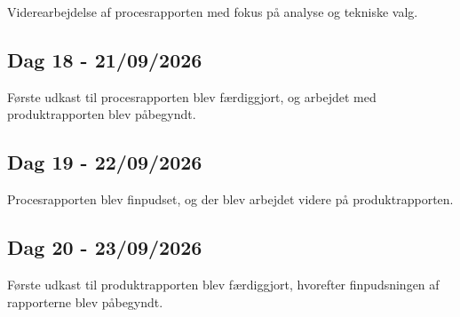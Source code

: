 \documentclass[a4paper, 11pt]{article}
\begin{document}
Viderearbejdelse af procesrapporten med fokus på analyse og tekniske valg.

\subsection{Dag 18 - 21/09/2026}

Første udkast til procesrapporten blev færdiggjort, og arbejdet med produktrapporten blev
påbegyndt.

\subsection{Dag 19 - 22/09/2026}

Procesrapporten blev finpudset, og der blev arbejdet videre på produktrapporten.

\subsection{Dag 20 - 23/09/2026}

Første udkast til produktrapporten blev færdiggjort, hvorefter finpudsningen af rapporterne
blev påbegyndt.
\end{document}
